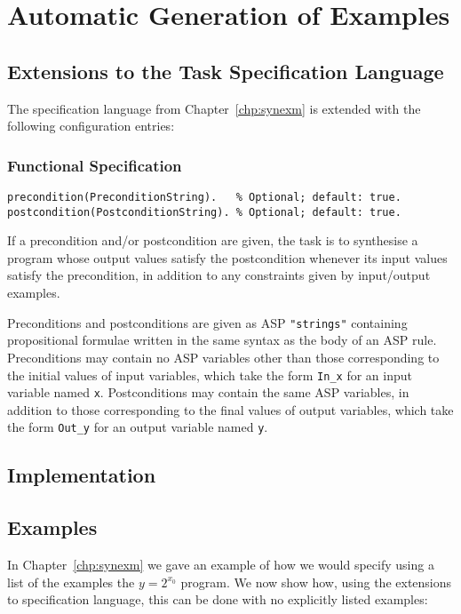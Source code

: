 \documentclass[a4paper,twoside,notitlepage]{report}
\newcommand{\ttt}{\texttt}
\begin{document}
\chapter{Automatic Generation of Examples} \label{chp:genexm}

\section{Extensions to the Task Specification Language}
The specification language from Chapter~\ref{chp:synexm} is extended with 
the following configuration entries:

\subsection{Functional Specification}

\begin{Verbatim}[samepage=true]
precondition(PreconditionString).   % Optional; default: true.
postcondition(PostconditionString). % Optional; default: true.
\end{Verbatim}
If a precondition and/or postcondition are given, the task is to synthesise a 
program whose output values satisfy the postcondition whenever its input 
values satisfy the precondition, in addition to any constraints given by 
input/output examples.

Preconditions and postconditions are given as ASP \verb|"strings"|
containing propositional formulae written in the same syntax as the body of an 
ASP rule. Preconditions may contain no ASP variables other than those 
corresponding to the initial values of input variables, which take the form 
\ttt{In\_x} for an input variable named \ttt{x}. Postconditions may contain 
the same ASP variables, in addition to those corresponding to the final values 
of output variables, which take the form \ttt{Out\_y} for an output variable 
named \ttt{y}.

\section{Implementation}

\section{Examples}

In Chapter~\ref{chp:synexm} we gave an example of how we would specify 
using a list of the examples the $y = 2^{x_0}$ program. We now show how, 
using the extensions to specification language, this can be done with no 
explicitly listed examples:
\end{document}

